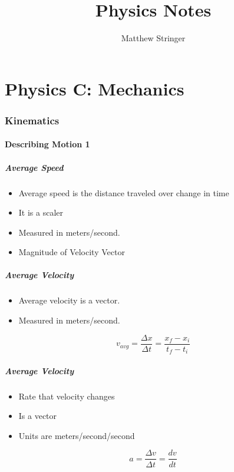 \documentclass[12pt]{article}
\title{Physics Notes} %
\date{}
\author{Matthew Stringer} %
\theoremstyle{break}
\numberwithin{theorem}{subsection}
\numberwithin{lemma}{subsection}
\numberwithin{corollary}{subsection}
\numberwithin{equation}{subsection}
\begin{document}
\maketitle
\newpage
\tableofcontents


\newpage
\part{Physics C: Mechanics}

\section{Kinematics}
\subsection{Describing Motion 1}

\subsubsection{Average Speed}
\begin{itemize}
	\item Average speed is the distance traveled over change in time
	\item It is a scaler
	\item Measured in meters/second.
	\item Magnitude of Velocity Vector
\end{itemize}

\subsubsection{Average Velocity}
\begin{itemize}
	\item Average velocity is a vector.
	\item Measured in meters/second.
\end{itemize}
\begin{equation*}
v_{avg} = \frac{\Delta x}{\Delta t} = \frac{x_f - x_i}{t_f - t_i}
\end{equation*}

\subsubsection{Average Velocity}
\begin{itemize}
	\item Rate that velocity changes
	\item Is a vector
	\item Units are meters/second/second
\end{itemize}
\begin{equation*}
a = \frac{\Delta v}{\Delta t} = \frac{dv}{dt}
\end{equation*}
\end{document}
